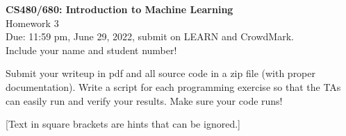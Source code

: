 \documentclass[10pt,letter,notitlepage]{article}
\newcounter{exercise}
\begin{document}
\begin{center}
\large{\textbf{CS480/680: Introduction to Machine Learning} \\ Homework 3\\ Due: 11:59 pm, June 29, 2022, submit on LEARN and CrowdMark.} \\

Include your name and student number!

\end{center}

\begin{center}
Submit your writeup in pdf and all source code in a zip file (with proper documentation). Write a script for each programming exercise so that the TAs can easily run and verify your results. Make sure your code runs!

[Text in square brackets are hints that can be ignored.]
\end{center}
\end{document}
